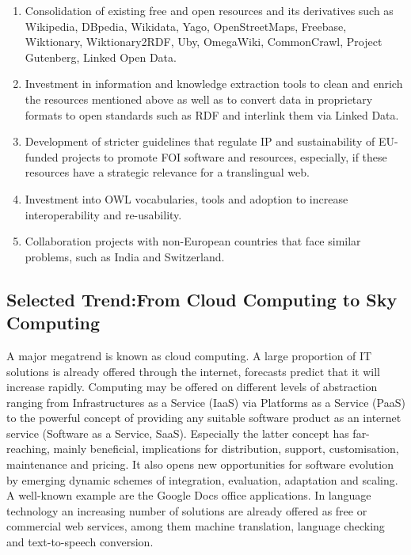 \documentclass[10pt, plain]{../../metanetpaper}
\begin{document}
\begin{multicols}{2}
\begin{enumerate}
\item Consolidation of existing free and open resources and its derivatives such as Wikipedia, DBpedia, Wikidata, Yago, OpenStreetMaps, Freebase, Wiktionary, Wiktionary2RDF, Uby, OmegaWiki, CommonCrawl,  Project Gutenberg, Linked Open Data.
\item Investment in information and knowledge extraction tools to clean and enrich the resources mentioned above as well as to convert data in proprietary formats to open standards such as RDF and interlink them via Linked Data.
\item Development of stricter guidelines that regulate IP and sustainability of EU-funded projects to promote FOI software and resources, especially, if these resources have a strategic relevance for a translingual web.
\item Investment into OWL vocabularies, tools and adoption to increase interoperability and re-usability.
\item Collaboration projects with non-European countries that face similar problems, such as India and Switzerland.
\end{enumerate}

\subsection[Selected Trend: From Cloud Computing to Sky Computing]{Selected Trend:\newline From Cloud Computing to Sky Computing}
\label{sec:cloud-sky-computing}

A major megatrend is known as cloud computing. A large proportion of IT solutions is already offered through the internet, forecasts predict that it will increase rapidly. Computing may be offered on different levels of abstraction ranging from Infrastructures as a Service (IaaS) via Platforms as a Service (PaaS) to the powerful concept of providing any suitable software product as an internet service (Software as a Service, SaaS). Especially the latter concept has far-reaching, mainly beneficial, implications for distribution, support, customisation, maintenance and pricing. It also opens new opportunities for software evolution by emerging dynamic schemes of integration, evaluation, adaptation and scaling. A well-known example are the Google Docs office applications. In language technology an increasing number of solutions are already offered as free or commercial web services, among them machine translation, language checking and text-to-speech conversion.


\end{multicols}
\end{document}
